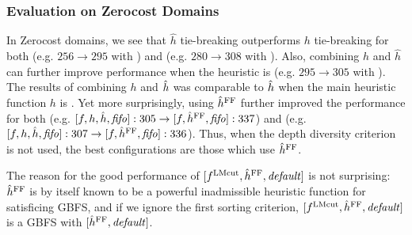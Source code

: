 \subsubsection{Evaluation on Zerocost Domains}

In Zerocost domains, we see that $\hat{h}$ tie-breaking outperforms $h$ tie-breaking for both \lmcut (e.g. $256\rightarrow 295$ with \fifo) and \mands (e.g. $280\rightarrow 308$ with \fifo).
Also, combining $h$ and $\hat{h}$ can further improve performance when the heuristic is \lmcut (e.g. $295\rightarrow 305$ with \fifo).
The results of combining $h$ and $\hat{h}$ was comparable to $\hat{h}$ when the main heuristic function $h$ is \mands.
% 
Yet more surprisingly, using $\hat{h}^{\text{FF}}$ further improved the performance for both \lmcut
(e.g. $[f,h,\hat{h},{\text{\textit{fifo}}}]:305 \rightarrow [f,\hat{h}^{\text{FF}},{\text{\textit{fifo}}}]:337$) and \mands 
(e.g. $[f,h,\hat{h},{\text{\textit{fifo}}}]:307 \rightarrow [f,\hat{h}^{\text{FF}},{\text{\textit{fifo}}}]:336$).
% 
Thus, when the depth diversity criterion  is not used, the best configurations are those
which use $\hat{h}^{\text{FF}}$.

The reason for the good performance of $[f^{\text{LMcut}},\hat{h}^{\text{FF}},{\text{\textit{default}}}]$ is not surprising:
$\hat{h}^{\text{FF}}$ is by itself known to be a powerful inadmissible heuristic
function for satisficing GBFS, and 
if we ignore the first sorting criterion, $[f^{\text{LMcut}},\hat{h}^{\text{FF}},{\text{\textit{default}}}]$ is a GBFS with $[\hat{h}^{\text{FF}},{\text{\textit{default}}}]$.

